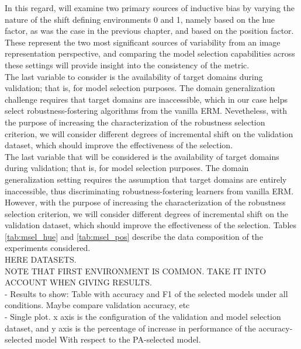 In this regard, will examine two primary sources of inductive bias by varying the nature of the
shift defining environments 0 and 1, namely based on the hue factor, as was the case in the
previous chapter, and based on the position factor. These represent the two most significant 
sources of variability from an image representation perspective, and comparing the model selection 
capabilities across these settings will provide insight into the consistency of the metric. \\

The last variable to consider is the availability of target domains during validation; that is,
for model selection purposes. The domain generalization challenge requires that target domains are
inaccessible, which in our case helps select robustness-fostering algorithms from the 
vanilla ERM. Nevetheless, with the purpose of increasing the characterization of the robustness 
selection criterion, we will consider different degrees of incremental shift on the validation 
dataset, which should improve the effectiveness of the selection. \\

The last variable that will be considered is the availability of target domains during validation; 
that is, for model selection purposes. The domain generalization setting requires the assumption
that target domains are entirely inaccessible, thus discriminating robustness-fostering learners
from vanilla ERM. However, with the purpose of increasing the characterization of the robustness 
selection criterion, we will consider different degrees of incremental shift on the validation 
dataset, which should improve the effectiveness of the 
selection. Tables \ref{tab:msel_hue} and \ref{tab:msel_pos} describe the data composition of the
experiments considered. \\

HERE DATASETS. \\

NOTE THAT FIRST ENVIRONMENT IS COMMON. TAKE IT INTO ACCOUNT WHEN GIVING RESULTS. \\

- Results to show: Table with accuracy and F1 of the selected models under all conditions. 
Maybe compare validation accuracy, etc \\

- Single plot. x axis is the configuration of the validation and model selection dataset,
and y axis is the percentage of increase in performance of the accuracy-selected model With
respect to the PA-selected model. \\

